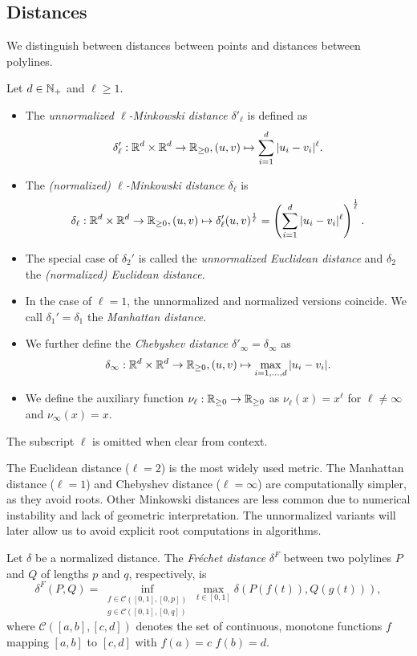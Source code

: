\subsection{Distances}
\label{ssec:distances}
We distinguish between distances between points and distances between polylines. 

\begin{definition}[Distances]\label{def:point_distance}
  Let \(d \in \mathbb{N}_+\) and \(\ell \geq 1\).
  \begin{itemize}
    \item The \emph{unnormalized \(\ell\)-Minkowski distance} \(\delta'_\ell\) is defined as 
      \[\delta'_\ell:\mathbb{R}^d \times \mathbb{R}^d \to \mathbb{R}_{\geq 0}, (u, v) \mapsto \sum_{i = 1}^d |u_i - v_i|^\ell.\]
    \item The \emph{(normalized) \(\ell\)-Minkowski distance} \(\delta_\ell\) is 
      \[\delta_\ell:\mathbb{R}^d \times \mathbb{R}^d \to \mathbb{R}_{\geq 0}, (u, v) \mapsto \delta'_\ell(u, v)^{\frac1\ell} = \left(\sum_{i = 1}^d |u_i - v_i|^\ell\right)^{\frac1\ell}.\]
    \item The special case of \(\delta_2'\) is called the \emph{unnormalized Euclidean distance} and \(\delta_2\) the \emph{(normalized) Euclidean distance}.
    \item In the case of \(\ell = 1\), the unnormalized and normalized versions coincide. We call \(\delta_1' = \delta_1\) the \emph{Manhattan distance}. 
    \item We further define the \emph{Chebyshev distance} \(\delta'_\infty = \delta_\infty\) as 
      \[\delta_\infty:\mathbb{R}^d \times \mathbb{R}^d \to \mathbb{R}_{\geq 0}, (u, v) \mapsto \max_{i = 1, \dots, d} |u_i - v_i|.\]
    \item We define the auxiliary function \(\nu_\ell:\mathbb{R}_{\geq 0} \to \mathbb{R}_{\geq 0}\) as \(\nu_\ell(x) = x^\ell\) for \(\ell \neq \infty\) and \(\nu_\infty(x) = x\).
  \end{itemize}

  The subscript \(\ell\) is omitted when clear from context.
\end{definition}

The Euclidean distance (\(\ell = 2\)) is the most widely used metric. The Manhattan distance (\(\ell = 1\)) and Chebyshev distance (\(\ell = \infty\)) are computationally simpler, as they avoid roots. 
Other Minkowski distances are less common due to numerical instability and lack of geometric interpretation. The unnormalized variants will later allow us to avoid explicit root computations in algorithms. 

\begin{definition}
  Let \(\delta\) be a normalized distance. The \emph{Fréchet distance} \(\delta^F\) between two polylines \(P\) and \(Q\) of lengths \(p\) and \(q\), respectively, is 
	\[\delta^F(P, Q) = \inf_{\substack{f \in \mathcal{C}([0,1], [0, p]) \\ g \in \mathcal{C}([0,1], [0, q])}} \max_{t \in [0,1]}\delta(P(f(t)), Q(g(t))),\]
	where \(\mathcal{C}([a,b], [c,d])\) denotes the set of continuous, monotone functions \(f\) mapping \([a,b]\) to \([c,d]\) with \(f(a) = c\) \(f(b) = d\).
\end{definition}

